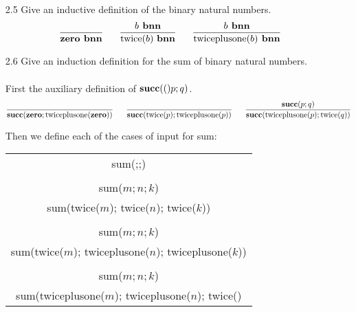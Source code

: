 \documentclass[11pt]{article}
\begin{document}
\begin{enumerate}
\begin{enumerate}
    \item[2.5] Give an inductive definition of the binary natural numbers.
    \[
    \frac{}{\zero \textbf{ bnn}} \ \ \ \ \ 
    \frac{b \textbf{ bnn}}{\text{twice}(b) \ \textbf{bnn}} \ \ \ \ \ 
    \frac{b \textbf{ bnn}}{\text{twiceplusone}(b) \textbf{ bnn}}
    \]
    
    \item[2.6] Give an induction definition for the sum of binary natural numbers. \\\\
    First the auxiliary definition of $\textbf{succ}(()p;q)$.
    \[
    \frac{}{\suc{\zero;\text{twiceplusone}(\zero)}} \ \ \ \ \ 
    \frac{}{\suc{\text{twice}(p);\text{twiceplusone}(p)}} \ \ \ \ \
    \frac{\suc{p;q}}{\suc{\text{twiceplusone}(p);\text{twice}(q)}}
    \]
    
    Then we define each of the cases of input for sum:
    \begin{center}
        \begin{tabular}{c}
             \hline
             sum(\zero;\zero;\zero)\\\\
             sum($m;n;k$)\\
             \hline
             sum(twice($m$); twice($n$); twice($k$))\\\\
             sum($m;n;k$)\\
             \hline
             sum(twice($m$); twiceplusone($n$); twiceplusone($k$))\\\\
             sum($m;n;k$)\\
             \hline
             sum(twiceplusone($m$); twiceplusone($n$); twice(\suc{$k$})\\
        \end{tabular}
    \end{center}
\end{enumerate}
\end{enumerate}
\end{document}
